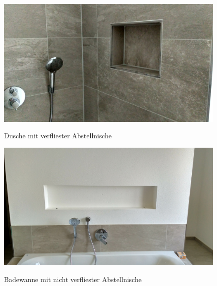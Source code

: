 \begin{figure}[h]
	\begin{center}
		\noindent\includegraphics[scale=0.1]{Resources/Praktikum/IMG_20180801_132004_HDR.jpg}
		\label{duschenische}
		\caption{Dusche mit verfliester Abstellnische}	
	\end{center}
\end{figure}

\begin{figure}[h]
	\begin{center}
		\noindent\includegraphics[scale=0.1]{Resources/Praktikum/IMG_20180801_131945_HDR.jpg}
		\label{wannenische}
		\caption{Badewanne mit nicht verfliester Abstellnische}	
	\end{center}
\end{figure}

